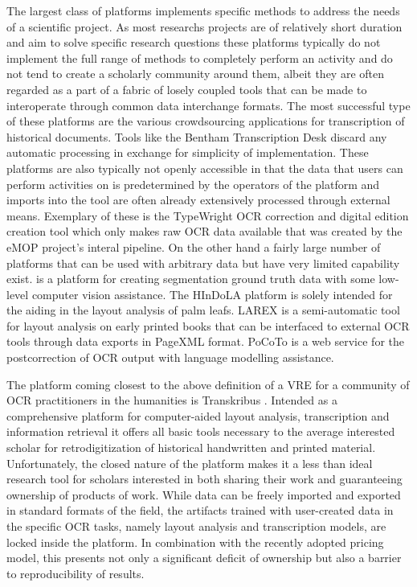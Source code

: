 The largest class of platforms implements specific methods to address the needs of
a scientific project. As most researchs projects are of relatively short
duration and aim to solve specific research questions these platforms typically
do not implement the full range of methods to completely perform an activity
and do not tend to create a scholarly community around them, albeit they are
often regarded as a part of a fabric of losely coupled tools that can be made
to interoperate through common data interchange formats. The most successful
type of these platforms are the various crowdsourcing applications for
transcription of historical documents. Tools like the Bentham Transcription
Desk \cite{moyle2011manuscript} discard any automatic processing in exchange for
simplicity of implementation. These platforms are also typically not openly
accessible in that the data that users can perform activities on is
predetermined by the operators of the platform and imports into the tool are
often already extensively processed through external means. Exemplary of these
is the TypeWright OCR correction and digital edition creation
tool \cite{typewright} which only makes raw OCR data available that was created
by the eMOP project's interal pipeline. On the other hand a fairly large number
of platforms that can be used with arbitrary data but have very limited
capability exist. \cite{webaletheia} is a platform for creating segmentation
ground truth data with some low-level computer vision assistance. The
HInDoLA \cite{trivedi2019hindola} platform is solely intended for the aiding in
the layout analysis of palm leafs. LAREX \cite{reul2017larex} is a
semi-automatic tool for layout analysis on early printed books that can be
interfaced to external OCR tools through data exports in PageXML format. PoCoTo
\cite{vobl2014pocoto} is a web service for the postcorrection of OCR output
with language modelling assistance.

The platform coming closest to the above definition of a VRE for a community of
OCR practitioners in the humanities is Transkribus \cite{kahle2017transkribus}.
Intended as a comprehensive platform for computer-aided layout analysis,
transcription and information retrieval it offers all basic tools necessary to
the average interested scholar for retrodigitization of historical handwritten
and printed material. Unfortunately, the closed nature of the platform makes it
a less than ideal research tool for scholars interested in both sharing their
work and guaranteeing ownership of products of work. While data can be freely
imported and exported in standard formats of the field, the artifacts trained
with user-created data in the specific OCR tasks, namely layout analysis and
transcription models, are locked inside the platform. In combination with the
recently adopted pricing model, this presents not only a significant deficit of
ownership but also a barrier to reproducibility of results.

